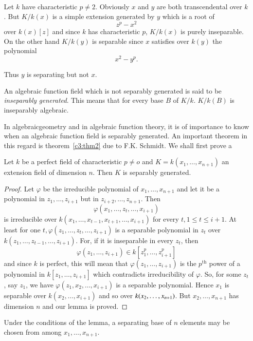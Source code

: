 Let $k$ have characteristic $p \neq 2$. Obviously $x$ and $y$ are both
transcendental over $k$. But $K/k(x)$ is a simple extension generated
by $y$ which is a root of  
$$
z^p-x^2
$$
over $k(x)[z]$ and since $k$ has characteristic $p$, $K/k(x)$ is purely
inseparable. On the other hand $K/k(y)$ is separable since $x$
satisfies over $k(y)$ the polynomial 
$$
x^2-y^p.
$$

Thus $y$ is separating but not $x$.

An algebraic function field which is not separably generated is said
to be \textit{inseparably generated}. This means that for every base
$B$ of $K/k$. $K/k(B)$ is inseparably algebraic. 

In algebraic\pageoriginale geometry and in algebraic function theory,
it is of 
importance to know when an algebraic function field is separably
generated. An important theorem in this regard is 
theorem~\ref{c3:thm2} due to F.K. Schmidt. We shall first prove a  

\begin{lemma*}
Let $k$ be a perfect field of characteristic $p \neq o$ and
  $K=k(x_1,\ldots,x_{n+1})$ an extension field of dimension $n$. Then
  $K$ is separably generated. 
\end{lemma*}

\begin{proof}
Let $\varphi$ be the irreducible polynomial of $x_1,\ldots,x_{n+1}$
and let it be a polynomial in $z_1,\ldots,z_{i+1}$ but in
$z_{i+2},\ldots,z_{n+1}$. Then 
$$
\varphi(x_1,\ldots,z_t,\ldots,x_{i+1})
$$
is irreducible over $k(x_1,\ldots,x_{t-1},x_{t+1},\ldots,x_{i+1})$ for
every $t,1 \leq t \leq i+1$. At least for one $t,
\varphi(z_1,\ldots,z_t,\ldots,z_{i+1})$ is a separable polynomial in
$z_t$ over $k(z_1,\ldots,z_{t-1},\ldots,z_{i+1})$. For, if it is
inseparable in every $z_t$, then 
$$
\varphi(z_1,\ldots,z_{i+1})\in k[z^p_1,\ldots,z^p_{i+1}]
$$
and since $k$ is perfect, this will mean that
$\varphi(z_1,\ldots,z_{i+1})$ is the $p^{\text{th}}$ power of a polynomial in
$k[z_1,\ldots,z_{i+1}]$ which contradicts irreducibility of
$\varphi$. So, for some $z_t$, say $z_1$, we have
$\varphi(z_1,x_2,\ldots,x_{i+1})$ is a separable polynomial. Hence
$x_1$ is separable over $k(x_2,\ldots,x_{i+1})$ and so over
$k(x_2,\break \ldots,x_{n+1})$. But $x_2,\ldots,x_{n+1}$ has dimension $n$
and our lemma is proved. 
\end{proof}

\begin{coro*}
Under the conditions of the lemma, a separating base of $n$
  elements may be chosen from among $x_1,\ldots,x_{n+1}$. 
\end{coro*}

